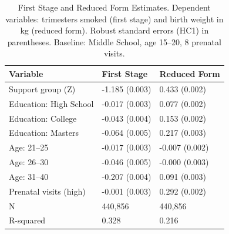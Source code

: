 \begin{table}[h!]
\centering
\caption{First Stage and Reduced Form Estimates. Dependent variables: trimesters smoked (first stage) and birth weight in kg (reduced form). Robust standard errors (HC1) in parentheses. Baseline: Middle School, age 15--20, 8 prenatal visits.} 
\label{tab:fs_rf}
\begingroup\small
\begin{tabular}{lll}
  \toprule
Variable & First Stage & Reduced Form \\ 
  \midrule
Support group (Z) & -1.185 (0.003) & 0.433 (0.002) \\ 
  Education: High School & -0.017 (0.003) & 0.077 (0.002) \\ 
  Education: College & -0.043 (0.004) & 0.153 (0.002) \\ 
  Education: Masters & -0.064 (0.005) & 0.217 (0.003) \\ 
  Age: 21--25 & -0.017 (0.003) & -0.007 (0.002) \\ 
  Age: 26--30 & -0.046 (0.005) & -0.000 (0.003) \\ 
  Age: 31--40 & -0.207 (0.004) & 0.091 (0.003) \\ 
  Prenatal visits (high) & -0.001 (0.003) & 0.292 (0.002) \\ 
  N & 440,856 & 440,856 \\ 
  R-squared & 0.328 & 0.216 \\ 
   \bottomrule
\end{tabular}
\endgroup
\end{table}

